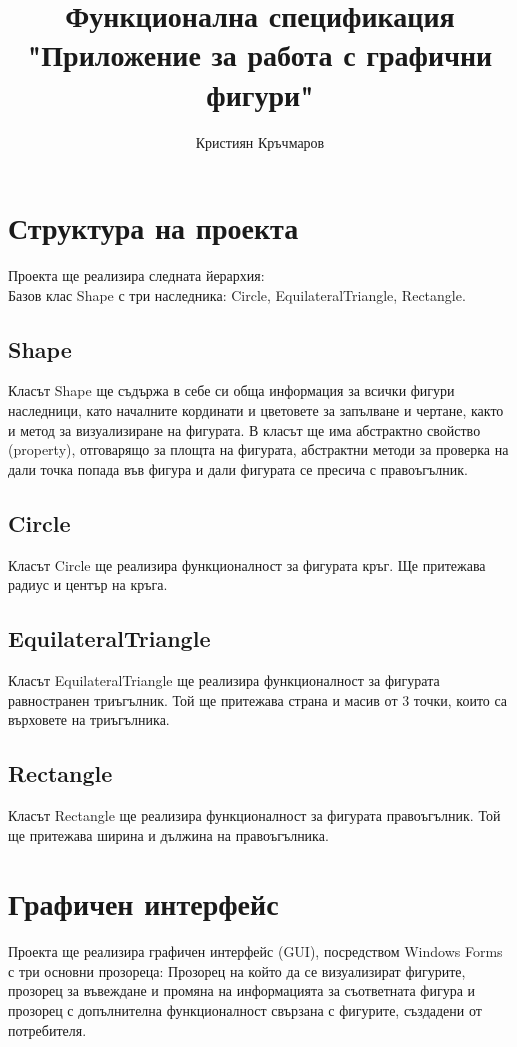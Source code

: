 \documentclass[a4paper,fleqn,12pt]{article}
\title{
  Функционална спецификация \\
  \large "Приложение за работа с графични фигури"}
\author{Кристиян Кръчмаров}
\begin{document}
\maketitle
\newpage

\tableofcontents
\newpage

\newpage
{}

\section{Структура на проекта}
Проекта ще реализира следната йерархия: \\
Базов клас Shape с три наследника: Circle, EquilateralTriangle, Rectangle. 

\subsection{Shape}
Класът Shape ще съдържа в себе си обща информация за всички фигури наследници, като началните кординати и цветовете за запълване и чертане, както и метод за визуализиране на фигурата. 
В класът ще има абстрактно свойство (property), отговарящо за площта на фигурата, абстрактни методи за проверка на дали точка попада във фигура и дали фигурата се пресича с правоъгълник.

\subsection{Circle}
Класът Circle ще реализира функционалност за фигурата кръг.
Ще притежава радиус и център на кръга. 

\subsection{EquilateralTriangle}
Класът EquilateralTriangle ще реализира функционалност за фигурата равностранен триъгълник. 
Той ще притежава страна и масив от 3 точки, които са върховете на триъгълника.

\subsection{Rectangle}
Класът Rectangle ще реализира функционалност за фигурата правоъгълник. 
Той ще притежава ширина и дължина на правоъгълника. 

\newpage

\section{Графичен интерфейс}
Проекта ще реализира графичен интерфейс (GUI), посредством Windows Forms с три основни прозореца: Прозорец на който да се визуализират фигурите, прозорец за въвеждане и промяна на информацията за съответната фигура и прозорец с допълнителна функционалност свързана с фигурите, създадени от потребителя. 
\end{document}
